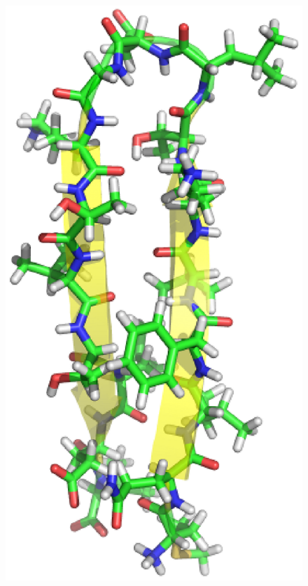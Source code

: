 \begin{figure}
\begin{center}
{\begin{minipage}{0.3\textwidth}
\includegraphics[width=\textwidth]{./img/1e0q-600.eps}\\

\end{minipage}}
\end{center}
\end{figure}
